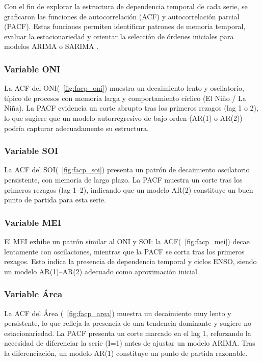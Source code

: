 Con el fin de explorar la estructura de dependencia temporal de cada serie, se graficaron 
las funciones de autocorrelación (ACF) y autocorrelación parcial (PACF). Estas funciones 
permiten identificar patrones de memoria temporal, evaluar la estacionariedad y orientar 
la selección de órdenes iniciales para modelos ARIMA o SARIMA \parencite{box2015time, hyndman2018forecasting}. 

\subsubsection{Variable ONI}

La ACF del ONI(~\ref{fig:facp_oni}) muestra un decaimiento lento y oscilatorio, típico de procesos con memoria 
larga y comportamiento cíclico (El Niño / La Niña). La PACF evidencia un corte abrupto 
tras los primeros rezagos (lag 1 o 2), lo que sugiere que un modelo autorregresivo de bajo 
orden (AR(1) o AR(2)) podría capturar adecuadamente su estructura.

\subsubsection{Variable SOI}

La ACF del SOI(~\ref{fig:facp_soi}) presenta un patrón de decaimiento oscilatorio persistente, con memoria de 
largo plazo. La PACF muestra un corte tras los primeros rezagos (lag 1–2), indicando que 
un modelo AR(2) constituye un buen punto de partida para esta serie.

\subsubsection{Variable MEI}

El MEI exhibe un patrón similar al ONI y SOI: la ACF(~\ref{fig:facp_mei}) decae lentamente con oscilaciones, 
mientras que la PACF se corta tras los primeros rezagos. Esto indica la presencia de 
dependencia temporal y ciclos ENSO, siendo un modelo AR(1)–AR(2) adecuado como 
aproximación inicial.

\subsubsection{Variable Área}

La ACF del Área (~\ref{fig:facp_area}) muestra un decaimiento muy lento y persistente, lo que refleja la 
presencia de una tendencia dominante y sugiere no estacionariedad. La PACF presenta un 
corte marcado en el lag 1, reforzando la necesidad de diferenciar la serie (I=1) antes de 
ajustar un modelo ARIMA. Tras la diferenciación, un modelo AR(1) constituye un punto de 
partida razonable.

